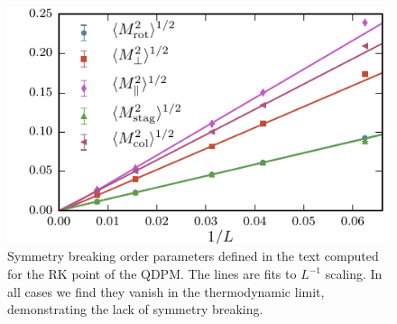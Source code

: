 \documentclass[twocolumn,prb,aps,floatfix,superscriptaddress]{revtex4-1}
\begin{document}
\begin{figure}[b]
    \centering
    \includegraphics[width=1.0\linewidth]{order_params_plot.pdf}
    \caption{Symmetry breaking order parameters defined in the text computed for the RK point of the QDPM. The lines are fits to $L^{-1}$ scaling. In all cases we find they vanish in the thermodynamic limit, demonstrating the lack of symmetry breaking.}
    \label{fig:order_params}
\end{figure}



\end{document}
